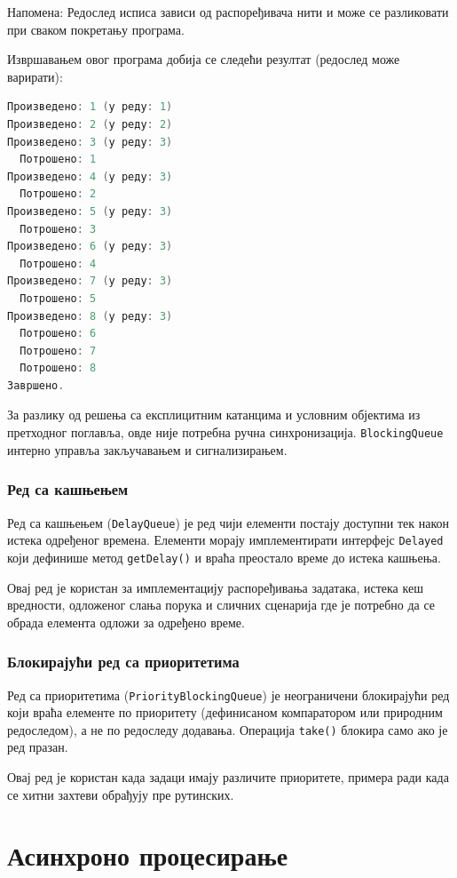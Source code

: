 Напомена: Редослед исписа зависи од распоређивача нити и може се разликовати при сваком покретању програма.

Извршавањем овог програма добија се следећи резултат (редослед може варирати):


\begin{lstlisting}[language=Java]
Произведено: 1 (у реду: 1)
Произведено: 2 (у реду: 2)
Произведено: 3 (у реду: 3)
  Потрошено: 1
Произведено: 4 (у реду: 3)
  Потрошено: 2
Произведено: 5 (у реду: 3)
  Потрошено: 3
Произведено: 6 (у реду: 3)
  Потрошено: 4
Произведено: 7 (у реду: 3)
  Потрошено: 5
Произведено: 8 (у реду: 3)
  Потрошено: 6
  Потрошено: 7
  Потрошено: 8
Завршено.
\end{lstlisting}


За разлику од решења са експлицитним катанцима и условним објектима из претходног поглавља, овде није потребна ручна синхронизација. \texttt{BlockingQueue} интерно управља закључавањем и сигнализирањем.


\subsubsection{Ред са кашњењем}

Ред са кашњењем (\texttt{DelayQueue}) је ред чији елементи постају доступни тек након истека одређеног времена. Елементи морају имплементирати интерфејс \texttt{Delayed} који дефинише метод \texttt{getDelay()} и враћа преостало време до истека кашњења.

Овај ред је користан за имплементацију распоређивања задатака, истека кеш вредности, одложеног слања порука и сличних сценарија где је потребно да се обрада елемента одложи за одређено време.


\subsubsection{Блокирајући ред са приоритетима}

Ред са приоритетима (\texttt{PriorityBlockingQueue}) је неограничени блокирајући ред који враћа елементе по приоритету (дефинисаном компаратором или природним редоследом), а не по редоследу додавања. Операција \texttt{take()} блокира само ако је ред празан.

Овај ред је користан када задаци имају различите приоритете, примера ради када се хитни захтеви обрађују пре рутинских.


\section{Асинхроно процесирање}


